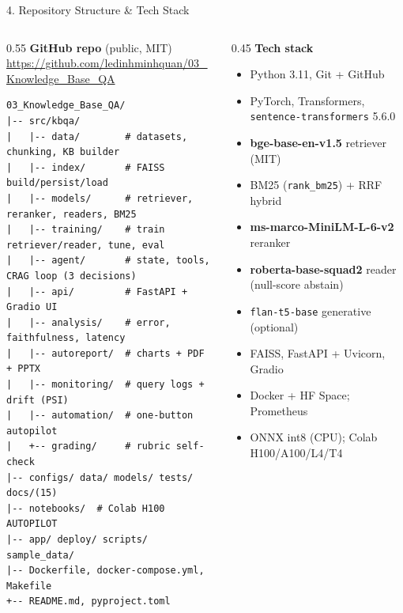 \documentclass[10pt,aspectratio=169]{beamer}
\begin{document}
\begin{frame}[fragile]{4. Repository Structure \& Tech Stack}
\begin{columns}[T]
\begin{column}{0.55\textwidth}
\textbf{GitHub repo} (public, MIT) \\
\scriptsize \url{https://github.com/ledinhminhquan/03_Knowledge_Base_QA}

\vspace{0.15cm}
\begin{lstlisting}[basicstyle=\ttfamily\tiny]
03_Knowledge_Base_QA/
|-- src/kbqa/
|   |-- data/        # datasets, chunking, KB builder
|   |-- index/       # FAISS build/persist/load
|   |-- models/      # retriever, reranker, readers, BM25
|   |-- training/    # train retriever/reader, tune, eval
|   |-- agent/       # state, tools, CRAG loop (3 decisions)
|   |-- api/         # FastAPI + Gradio UI
|   |-- analysis/    # error, faithfulness, latency
|   |-- autoreport/  # charts + PDF + PPTX
|   |-- monitoring/  # query logs + drift (PSI)
|   |-- automation/  # one-button autopilot
|   +-- grading/     # rubric self-check
|-- configs/ data/ models/ tests/ docs/(15)
|-- notebooks/  # Colab H100 AUTOPILOT
|-- app/ deploy/ scripts/ sample_data/
|-- Dockerfile, docker-compose.yml, Makefile
+-- README.md, pyproject.toml
\end{lstlisting}
\end{column}
\begin{column}{0.45\textwidth}
\textbf{Tech stack}
\begin{itemize}\scriptsize
  \item Python 3.11, Git + GitHub
  \item PyTorch, Transformers, \texttt{sentence-transformers} 5.6.0
  \item \textbf{bge-base-en-v1.5} retriever (MIT)
  \item BM25 (\texttt{rank\_bm25}) + RRF hybrid
  \item \textbf{ms-marco-MiniLM-L-6-v2} reranker
  \item \textbf{roberta-base-squad2} reader (null-score abstain)
  \item \texttt{flan-t5-base} generative (optional)
  \item FAISS, FastAPI + Uvicorn, Gradio
  \item Docker + HF Space; Prometheus
  \item ONNX int8 (CPU); Colab H100/A100/L4/T4
\end{itemize}
\end{column}
\end{columns}
\end{frame}
\end{document}
